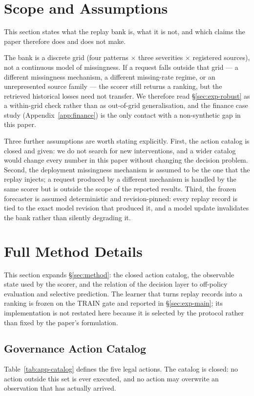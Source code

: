 \documentclass{article}
\begin{document}
\section{Scope and Assumptions}
\label{app:scope}
This section states what the replay bank is, what it is not, and which claims the paper
therefore does and does not make.

The bank is a discrete grid (four patterns $\times$ three severities $\times$ registered
sources), not a continuous model of missingness. If a request falls outside that grid --- a
different missingness mechanism, a different missing-rate regime, or an unrepresented source
family --- the scorer still returns a ranking, but the retrieved historical losses need not
transfer. We therefore read \S\ref{sec:exp-robust} as a within-grid check rather than as
out-of-grid generalisation, and the finance case study (Appendix~\ref{app:finance}) is the
only contact with a non-synthetic gap in this paper.

Three further assumptions are worth stating explicitly. First, the action catalog is closed and
given: we do not search for new interventions, and a wider catalog would change every number
in this paper without changing the decision problem. Second, the deployment missingness
mechanism is assumed to be the one that the replay injects; a request produced by a different
mechanism is handled by the same scorer but is outside the scope of the reported results.
Third, the frozen forecaster is assumed deterministic and revision-pinned: every replay record
is tied to the exact model revision that produced it, and a model update invalidates the bank
rather than silently degrading it.


\section{Full Method Details}
\label{app:method-details}
This section expands \S\ref{sec:method}: the closed action catalog, the observable state used
by the scorer, and the relation of the decision layer to off-policy evaluation and selective
prediction. The learner that turns replay records into a ranking is frozen on the TRAIN gate
and reported in \S\ref{sec:exp-main}; its implementation is not restated here because it is
selected by the protocol rather than fixed by the paper's formulation.

\subsection{Governance Action Catalog}
\label{app:catalog}
Table~\ref{tab:app-catalog} defines the five legal actions. The catalog is closed: no
action outside this set is ever executed, and no action may overwrite an observation that
has actually arrived.
\end{document}
